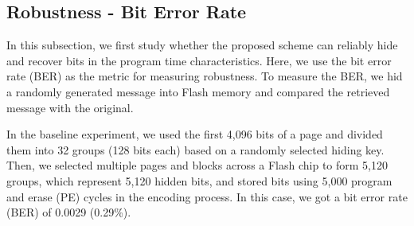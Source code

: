 


\subsection{Robustness - Bit Error Rate}

In this subsection, we first study whether the proposed scheme can 
reliably hide and recover bits in the program time characteristics.
Here, we use the bit error rate (BER) as the metric for measuring 
robustness. To measure the BER, we hid a randomly generated message
into Flash memory and compared the retrieved message with the original.

In the baseline experiment, we used the first 4,096 bits of a page and
divided them into 32 groups (128 bits each) based on a randomly 
selected hiding key. Then, we selected multiple pages and blocks across
a Flash chip to form 5,120 groups, which represent 5,120 hidden bits,
and stored bits using 5,000 program and erase (PE) cycles in the encoding 
process. 
In this case, we got a bit error rate (BER) of 0.0029 (0.29\%).


